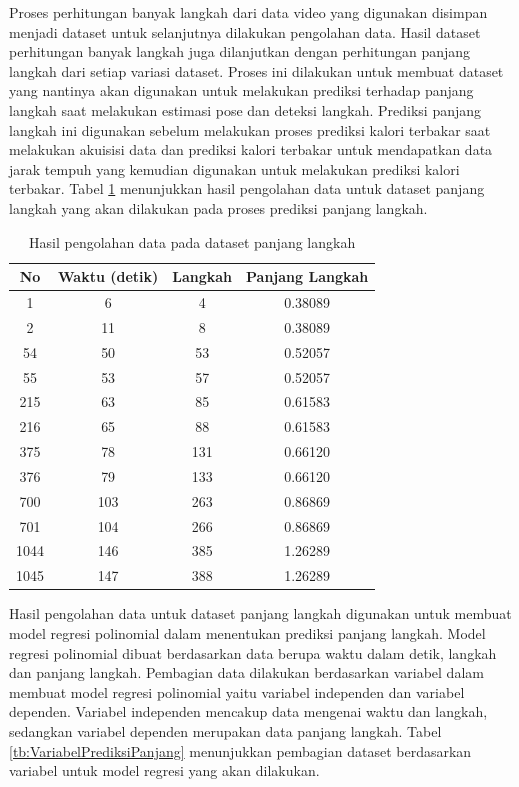 Proses perhitungan banyak langkah dari data video yang digunakan disimpan menjadi dataset untuk selanjutnya dilakukan pengolahan data. Hasil dataset perhitungan banyak langkah juga dilanjutkan dengan perhitungan panjang langkah dari setiap variasi dataset. Proses ini dilakukan untuk membuat dataset yang nantinya akan digunakan untuk melakukan prediksi terhadap panjang langkah saat melakukan estimasi pose dan deteksi langkah. Prediksi panjang langkah ini digunakan sebelum melakukan proses prediksi kalori terbakar saat melakukan akuisisi data dan prediksi kalori terbakar untuk mendapatkan data jarak tempuh yang kemudian digunakan untuk melakukan prediksi kalori terbakar. Tabel \ref{tb:OlahDatasetPanjang} menunjukkan hasil pengolahan data untuk dataset panjang langkah yang akan dilakukan pada proses prediksi panjang langkah.

\begin{longtable}{|c|c|c|c|}
  \caption{Hasil pengolahan data pada dataset panjang langkah}
  \label{tb:OlahDatasetPanjang}                                   \\
  \hline
  \rowcolor[HTML]{C0C0C0}
  \textbf{No} & \textbf{Waktu (detik)} & \textbf{Langkah} & \textbf{Panjang Langkah} \\
  \hline
  1   & 6    & 4    & 0.38089      \\
  \hline
  2   & 11    & 8    & 0.38089     \\
  \hline
  54   & 50    & 53    & 0.52057     \\
  \hline
  55   & 53    & 57    & 0.52057     \\
  \hline
  215   & 63    & 85    & 0.61583     \\
  \hline
  216   & 65    & 88    & 0.61583     \\
  \hline
  375   & 78    & 131    & 0.66120     \\
  \hline
  376   & 79    & 133    & 0.66120     \\
  \hline
  700   & 103    & 263    & 0.86869     \\
  \hline
  701   & 104    & 266    & 0.86869     \\
  \hline
  1044   & 146    & 385    & 1.26289     \\
  \hline
  1045   & 147    & 388    & 1.26289     \\
  \hline
\end{longtable}

Hasil pengolahan data untuk dataset panjang langkah digunakan untuk membuat model regresi polinomial dalam menentukan prediksi panjang langkah. Model regresi polinomial dibuat berdasarkan data berupa waktu dalam detik, langkah dan panjang langkah. Pembagian data dilakukan berdasarkan variabel dalam membuat model regresi polinomial yaitu variabel independen dan variabel dependen. Variabel independen mencakup data mengenai waktu dan langkah, sedangkan variabel dependen merupakan data panjang langkah. Tabel \ref{tb:VariabelPrediksiPanjang} menunjukkan pembagian dataset berdasarkan variabel untuk model regresi yang akan dilakukan.

